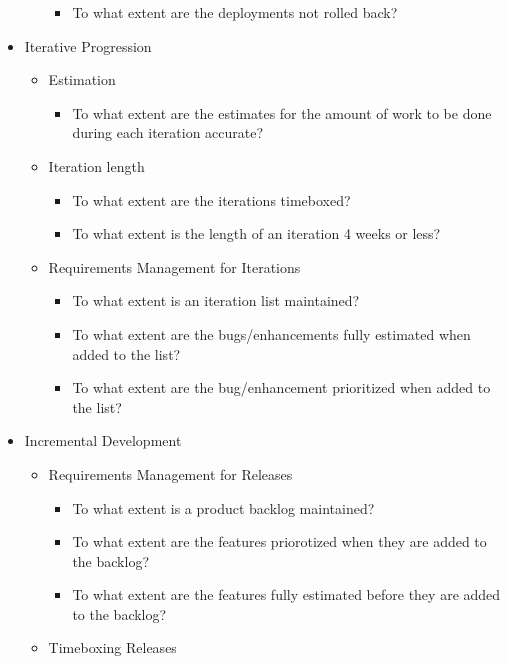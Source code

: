 \begin{appendices}
\begin{itemize}
\begin{itemize}
\begin{itemize}
					\item To what extent are the deployments not rolled back?
				\end{itemize}
		\end{itemize}
	\item Iterative Progression
		\begin{itemize}
			\item Estimation
				\begin{itemize}
					\item To what extent are the estimates for the amount of work to be done during each iteration accurate?
				\end{itemize}
			\item Iteration length
				\begin{itemize}
					\item To what extent are the iterations timeboxed?
					\item To what extent is the length of an iteration 4 weeks or less?
				\end{itemize}
			\item Requirements Management for Iterations
				\begin{itemize}
					\item To what extent is an iteration list maintained?
					\item To what extent are the bugs/enhancements fully estimated when added to the list?
					\item To what extent are the bug/enhancement prioritized when added to the list?
				\end{itemize}
		\end{itemize}
	\item Incremental Development
		\begin{itemize}
			\item Requirements Management for Releases
				\begin{itemize}
					\item To what extent is a product backlog maintained?
					\item To what extent are the features priorotized when they are added to the backlog?
					\item To what extent are the features fully estimated before they are added to the backlog?
				\end{itemize}
			\item Timeboxing Releases

\end{itemize}
\end{itemize}
\end{appendices}
